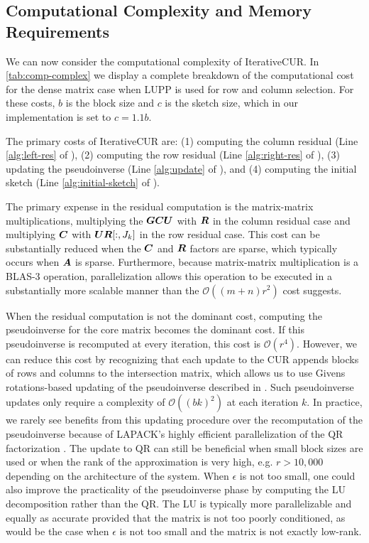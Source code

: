 \subsection{Computational Complexity and Memory Requirements}
We can now consider the computational complexity of IterativeCUR. In \cref{tab:comp-complex} we display a complete breakdown of the computational cost for the dense matrix case when LUPP is used for row and column selection. For these costs, $b$ is the block size and $c$ is the sketch size, which in our implementation is set to $c = 1.1b$. 

The primary costs of IterativeCUR are: (1) computing the column residual (Line \ref{alg:left-res} of \icur), (2) computing the row residual (Line \ref{alg:right-res} of \icur), (3) updating the pseudoinverse (Line \ref{alg:update} of \icur), and (4) computing the initial sketch (Line \ref{alg:initial-sketch} of \icur). 

The primary expense in the residual computation is the matrix-matrix multiplications, multiplying the $\boldsymbol{G} \boldsymbol{C} \boldsymbol{U}$ with $\boldsymbol{R}$ in the column residual case and multiplying $\boldsymbol{C}$ with $\boldsymbol{U} \boldsymbol{R}[:,J_k]$ in the row residual case. This cost can be substantially reduced when the $\boldsymbol{C}$ and $\boldsymbol{R}$ factors are sparse, which typically occurs when $\boldsymbol{A}$ is sparse. Furthermore, because matrix-matrix multiplication is a BLAS-3 operation, parallelization allows this operation to be executed in a substantially more scalable manner than the $\mathcal{O}((m + n)r^2)$ cost suggests.

When the residual computation is not the dominant cost, computing the pseudoinverse for the core matrix becomes the dominant cost. If this pseudoinverse is recomputed at every iteration, this cost is $\mathcal{O}(r^4)$. However, we can reduce this cost by recognizing that each update to the CUR appends blocks of rows and columns to the intersection matrix, which allows us to use Givens rotations-based updating of the pseudoinverse described in \cite{stewart1998matrix}. Such pseudoinverse updates only require a complexity of $\mathcal{O}((bk)^2)$ at each iteration $k$. In practice, we rarely see benefits from this updating procedure over the recomputation of the pseudoinverse because of LAPACK's highly efficient parallelization of the QR factorization \cite{buttari2008parallel}. %
The update to QR can still be beneficial when small block sizes are used or when the rank of the approximation is very high, e.g. $r > 10,000$ depending on the architecture of the system. When $\epsilon$ is not too small,
one could also improve the practicality of the pseudoinverse phase by computing the LU decomposition rather than the QR. The LU is typically more parallelizable and equally as accurate provided that the matrix is not too poorly conditioned, as would be the case when $\epsilon$ is not too small and the matrix is not exactly low-rank.


